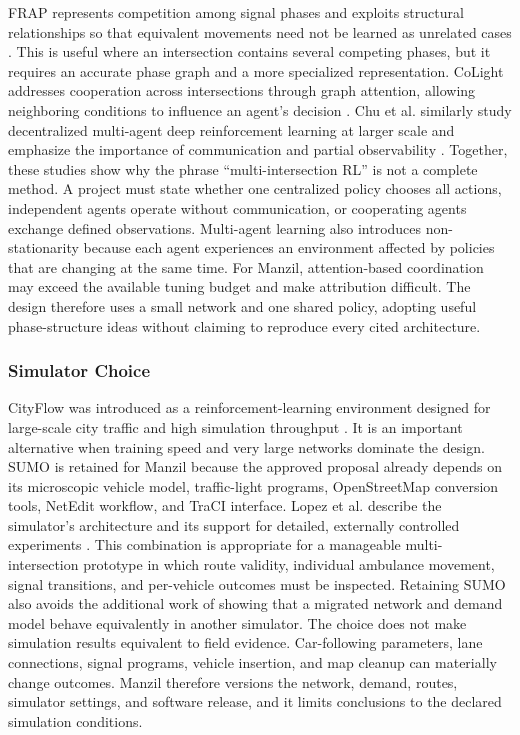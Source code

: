 FRAP represents competition among signal phases and exploits structural relationships so that equivalent movements need not be learned as unrelated cases \cite{zheng2019frap}. This is useful where an intersection contains several competing phases, but it requires an accurate phase graph and a more specialized representation. CoLight addresses cooperation across intersections through graph attention, allowing neighboring conditions to influence an agent's decision \cite{wei2019colight}. Chu et al. similarly study decentralized multi-agent deep reinforcement learning at larger scale and emphasize the importance of communication and partial observability \cite{chu2020marl}. Together, these studies show why the phrase ``multi-intersection RL'' is not a complete method. A project must state whether one centralized policy chooses all actions, independent agents operate without communication, or cooperating agents exchange defined observations. Multi-agent learning also introduces non-stationarity because each agent experiences an environment affected by policies that are changing at the same time. For Manzil, attention-based coordination may exceed the available tuning budget and make attribution difficult. The design therefore uses a small network and one shared policy, adopting useful phase-structure ideas without claiming to reproduce every cited architecture.

\subsubsection{Simulator Choice}

CityFlow was introduced as a reinforcement-learning environment designed for large-scale city traffic and high simulation throughput \cite{zhang2019cityflow}. It is an important alternative when training speed and very large networks dominate the design. SUMO is retained for Manzil because the approved proposal already depends on its microscopic vehicle model, traffic-light programs, OpenStreetMap conversion tools, NetEdit workflow, and TraCI interface. Lopez et al. describe the simulator's architecture and its support for detailed, externally controlled experiments \cite{lopez2018sumo}. This combination is appropriate for a manageable multi-intersection prototype in which route validity, individual ambulance movement, signal transitions, and per-vehicle outcomes must be inspected. Retaining SUMO also avoids the additional work of showing that a migrated network and demand model behave equivalently in another simulator. The choice does not make simulation results equivalent to field evidence. Car-following parameters, lane connections, signal programs, vehicle insertion, and map cleanup can materially change outcomes. Manzil therefore versions the network, demand, routes, simulator settings, and software release, and it limits conclusions to the declared simulation conditions.

